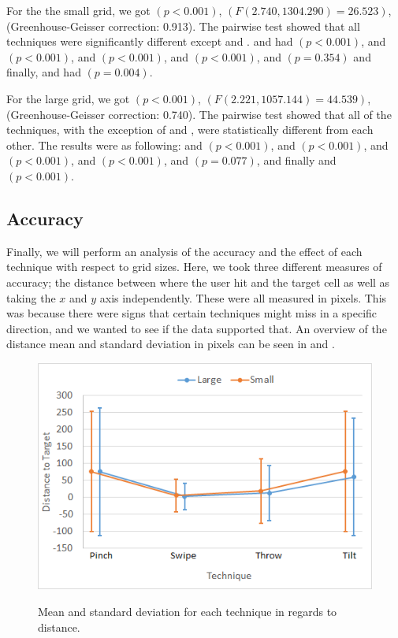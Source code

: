 For the the small grid, we got $(p<0.001)$, $(F(2.740, 1304.290)=26.523)$, (Greenhouse-Geisser correction: 0.913).
The pairwise test showed that all techniques were significantly different except \swipe and \tilt. 
\pinch and \swipe had $(p < 0.001)$, 
\pinch and \throw $(p <0.001)$, 
\pinch and \tilt $(p < 0.001)$, 
\swipe and \throw $(p < 0.001)$, 
\swipe and \tilt $(p = 0.354)$ and finally, 
\throw and \tilt had $(p = 0.004)$. 

For the large grid, we got $(p<0.001)$, $(F(2.221, 1057.144)=44.539)$, (Greenhouse-Geisser correction: 0.740).
The pairwise test showed that all of the techniques, with the exception of \swipe and \tilt, were statistically different from each other. The results were as following: 
\pinch and \swipe $(p<0.001)$, 
\pinch and \throw $(p<0.001)$, 
\pinch and \tilt $(p<0.001)$, 
\swipe and \throw $(p<0.001)$, 
\swipe and \tilt $(p=0.077)$, and finally 
\throw and \tilt $(p<0.001)$.

\subsection{Accuracy}
Finally, we will perform an analysis of the accuracy and the effect of each technique with respect to grid sizes.
Here, we took three different measures of accuracy; the distance between where the user hit and the target cell as well as taking the $x$ and $y$ axis independently. 
These were all measured in pixels.
This was because there were signs that certain techniques might miss in a specific direction, and we wanted to see if the data supported that. 
An overview of the distance mean and standard deviation in pixels can be seen in  and .

\begin{figure}[H]
	{\includegraphics[width = 1\columnwidth ]{images/distance.png}} 
	\caption{
		Mean and standard deviation for each technique in regards to distance.
	}
	\label{fig:distanceResults}
\end{figure}

